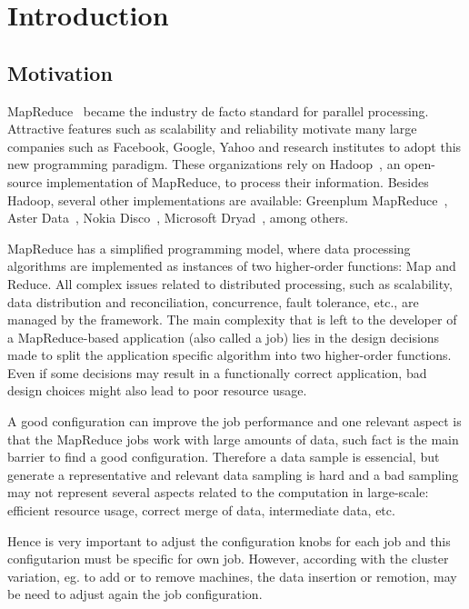 \chapter{Introduction} %
\label{cha:introduction}

\section{Motivation}

MapReduce~\cite{Dean:2004} became the industry de facto standard for parallel processing. Attractive features such as scalability and reliability motivate many large companies such as Facebook, Google, Yahoo and research institutes to adopt this new programming paradigm. 
These organizations rely on Hadoop~\cite{White:2009}, an open-source implementation of MapReduce, to process their information.
Besides Hadoop, several other implementations are available: Greenplum MapReduce~\cite{Greenplum:2008}, Aster Data~\cite{Aster:2011}, Nokia Disco~\cite{Mundkur:2011},  Microsoft Dryad~\cite{Isard:2007}, among others.

MapReduce has a simplified programming model, where data processing algorithms are implemented as instances of two higher-order functions: Map and Reduce. All complex issues related to distributed processing, such as scalability, data distribution and reconciliation, concurrence, fault tolerance, etc., are managed by the framework.
The main complexity that is left to the developer of a MapReduce-based application (also called a job) lies in the design decisions made to split the application specific algorithm into two higher-order functions. Even if some decisions may result in a functionally correct application, bad design choices might also lead to poor resource usage.

A good configuration can improve the job performance and one relevant aspect is
that the MapReduce jobs work with large amounts of data, such fact is the
main barrier to find a good configuration. Therefore a data sample is
essencial, but generate a representative and relevant data sampling is hard
and a bad sampling may not represent several aspects related to the computation
in large-scale: efficient resource usage, correct merge of data, intermediate
data, etc.


Hence is very important to adjust the configuration knobs for each job and this
configutarion must be specific for own job. However, according with the cluster
variation, eg. to add or to remove machines, the data insertion or remotion,
may be need to adjust again the job configuration.

